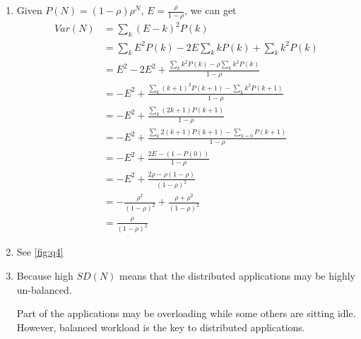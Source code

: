 \begin{enumerate}
    \item Given $P(N) = (1-\rho)\rho^N$, $E = \frac{\rho}{1-\rho}$, we can get
          \begin{align*}
              Var(N) & = \sum_{k} (E - k)^2 P(k)                                             \\
                     & = \sum_{k} E^2 P(k) - 2E \sum_k kP(k) + \sum_k k^2P(k)                \\
                     & = E^2 - 2E^2  + \frac{\sum_k k^2P(k) - \rho \sum_k k^2P(k)}{1 - \rho} \\
                     & = -E^2 + \frac{\sum_k (k+1)^2P(k+1) - \sum_k k^2P(k+1)}{1 - \rho}     \\
                     & = -E^2 + \frac{\sum_k (2k+1)P(k+1)}{1 - \rho}                         \\
                     & = -E^2 + \frac{\sum_k 2(k+1)P(k+1) - \sum_{k=0} P(k+1)}{1 - \rho}     \\
                     & = -E^2 + \frac{2E - (1 - P(0))}{1 - \rho}                             \\
                     & = -E^2 + \frac{2\rho - \rho(1-\rho)}{(1 - \rho)^2}                    \\
                     & = -\frac{\rho^2}{(1-\rho)^2} + \frac{\rho + \rho^2}{(1 - \rho)^2}     \\
                     & = \frac{\rho}{(1-\rho)^2}
          \end{align*}
    \item See \autoref{fig:q4}
          \begin{figure}[h!]
              \centering
              \label{fig:q4}
          \end{figure}
    \item Because high $SD(N)$ means that the distributed applications may be highly un-balanced.

          Part of the applications may be overloading while some others are sitting idle.
          However, balanced workload is the key to distributed applications.
\end{enumerate}